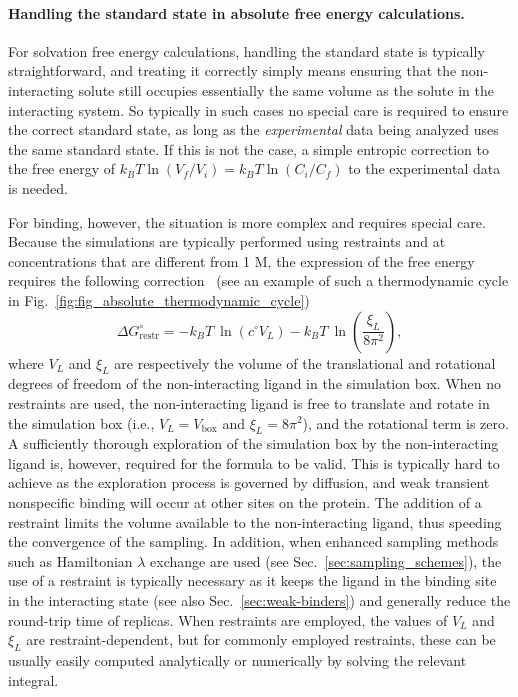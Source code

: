 \documentclass[9pt,bestpractices,pubversion]{livecoms}
\begin{document}
\paragraph{Handling the standard state in absolute free energy calculations.}
For solvation free energy calculations, handling the standard state is typically straightforward, and treating it correctly simply means ensuring that the non-interacting solute still occupies essentially the same volume as the solute in the interacting system.
So typically in such cases no special care is required to ensure the correct standard state, as long as the \emph{experimental} data being analyzed uses the same standard state.
If this is not the case, a simple entropic correction to the free energy of $k_B T\ln (V_f/V_i) = k_B T \ln (C_i/C_f)$ to the experimental data is needed.

For binding, however, the situation is more complex and requires special care.
Because the simulations are typically performed using restraints and at concentrations that are different from 1 M, the expression of the free energy requires the following correction~\cite{gilson1997statisticalthermodynamic} (see an example of such a thermodynamic cycle in Fig.~\ref{fig:fig_absolute_thermodynamic_cycle})
\begin{equation}\label{eq:restraint-correction}
    \Delta G^{\circ}_{\mathrm{restr}} = -k_BT ~ \ln \left( c^{\circ}{V_L} \right) -k_BT ~ \ln \left( \frac{\xi_L}{8 \pi^2} \right),
\end{equation}
where $V_L$ and $\xi_L$ are respectively the volume of the translational and rotational degrees of freedom of the non-interacting ligand in the simulation box.
When no restraints are used, the non-interacting ligand is free to translate and rotate in the simulation box (i.e., $V_L = V_{\mathrm{box}}$ and $\xi_L = 8\pi^2$), and the rotational term is zero.
A sufficiently thorough exploration of the simulation box by the non-interacting ligand is, however, required for the formula to be valid.
This is typically hard to achieve as the exploration process is governed by diffusion, and weak transient nonspecific binding will occur at other sites on the protein. 
The addition of a restraint limits the volume available to the non-interacting ligand, thus speeding the convergence of the sampling.
In addition, when enhanced sampling methods such as Hamiltonian $\lambda$ exchange are used (see Sec.~\ref{sec:sampling_schemes}), the use of a restraint is typically necessary as it keeps the ligand in the binding site in the interacting state (see also Sec.~\ref{sec:weak-binders}) and generally reduce the round-trip time of replicas.
When restraints are employed, the values of $V_L$ and $\xi_L$ are restraint-dependent, but for commonly employed restraints, these can be usually easily computed analytically or numerically by solving the relevant integral.
\end{document}
